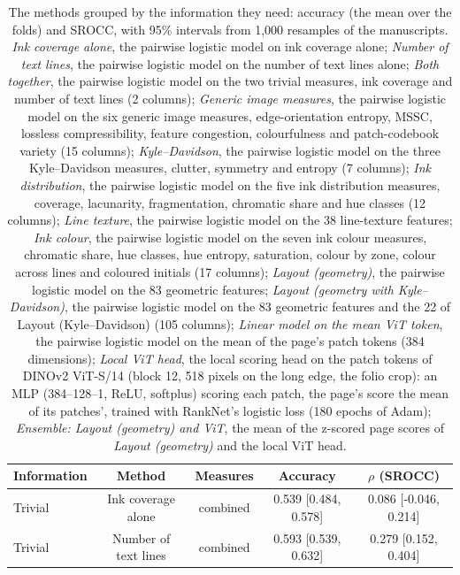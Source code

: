 \begin{table}[htbp]
  \centering
  \caption{The methods grouped by the information they need: accuracy (the mean over the folds) and SROCC, with 95\% intervals from 1,000 resamples of the manuscripts. \emph{Ink coverage alone}, the pairwise logistic model on ink coverage alone; \emph{Number of text lines}, the pairwise logistic model on the number of text lines alone; \emph{Both together}, the pairwise logistic model on the two trivial measures, ink coverage and number of text lines (2 columns); \emph{Generic image measures}, the pairwise logistic model on the six generic image measures, edge-orientation entropy, MSSC, lossless compressibility, feature congestion, colourfulness and patch-codebook variety (15 columns); \emph{Kyle--Davidson}, the pairwise logistic model on the three Kyle--Davidson measures, clutter, symmetry and entropy (7 columns); \emph{Ink distribution}, the pairwise logistic model on the five ink distribution measures, coverage, lacunarity, fragmentation, chromatic share and hue classes (12 columns); \emph{Line texture}, the pairwise logistic model on the 38 line-texture features; \emph{Ink colour}, the pairwise logistic model on the seven ink colour measures, chromatic share, hue classes, hue entropy, saturation, colour by zone, colour across lines and coloured initials (17 columns); \emph{Layout (geometry)}, the pairwise logistic model on the 83 geometric features; \emph{Layout (geometry with Kyle--Davidson)}, the pairwise logistic model on the 83 geometric features and the 22 of Layout (Kyle--Davidson) (105 columns); \emph{Linear model on the mean ViT token}, the pairwise logistic model on the mean of the page's patch tokens (384 dimensions); \emph{Local ViT head}, the local scoring head on the patch tokens of DINOv2 ViT-S/14 (block 12, 518 pixels on the long edge, the folio crop): an MLP (384--128--1, ReLU, softplus) scoring each patch, the page's score the mean of its patches', trained with RankNet's logistic loss (180 epochs of Adam); \emph{Ensemble: Layout (geometry) and ViT}, the mean of the z-scored page scores of \emph{Layout (geometry)} and the local ViT head.}
  \label{tab:baselines_by_information}
  \begin{tabular}{lcccc}
    \toprule
    Information & Method & Measures & Accuracy & $\rho$ (SROCC) \\
    \midrule
    Trivial & Ink coverage alone & combined & 0.539 [0.484, 0.578] & 0.086 [-0.046, 0.214] \\
    Trivial & Number of text lines & combined & 0.593 [0.539, 0.632] & 0.279 [0.152, 0.404] \\

\end{tabular}
\end{table}
